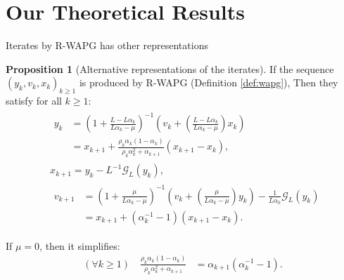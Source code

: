 \documentclass[11pt]{beamer}
\theoremstyle{definition}
\newtheorem{proposition}{Proposition}[section]
\begin{document}
\section{Our Theoretical Results}
    \begin{frame}{Iterates by R-WAPG has other representations}
        \begin{proposition}[Alternative representations of the iterates]\label{prop:wapg-first-equivalent-repr}
            If the sequence $(y_k, v_k, x_k)_{k \ge 1}$ is produced by R-WAPG (Definition \ref{def:wapg}),
            Then they satisfy for all $k\ge 1$: 
            {\footnotesize
            \begin{align}
                & \begin{aligned}
                    y_{k} &=
                    \left(
                        1 + \frac{L - L\alpha_{k}}{L\alpha_{k} - \mu}
                    \right)^{-1}
                    \left(
                        v_{k} +
                        \left(\frac{L - L\alpha_{k}}{L\alpha_{k} - \mu} \right) x_{k}
                    \right)
                    \\
                    &= x_{k + 1} +
                    \frac{\rho_k\alpha_k(1 - \alpha_k)}
                    {\rho_k\alpha_k^2 + \alpha_{k + 1}}(x_{k + 1} - x_k), 
                \end{aligned}
                \\
                & x_{k + 1} =
                y_k - L^{-1} \mathcal G_L (y_k),
                \\
                & \begin{aligned}
                    v_{k + 1} 
                    &=
                    \left(
                        1 + \frac{\mu}{L \alpha_k - \mu}
                    \right)^{-1}
                    \left(
                        v_k +
                        \left(\frac{\mu}{L \alpha_k - \mu}\right) y_k
                    \right) - \frac{1}{L\alpha_{k}}\mathcal G_L (y_k)
                    \\
                    &= 
                    x_{k + 1} + (\alpha_k^{-1} - 1)(x_{k + 1} - x_k).
                \end{aligned}
            \end{align}
            }
        \end{proposition}
        If $\mu = 0$, then it simplifies:
        {\small
        \begin{align*}
            (\forall k \ge 1) \quad
            \frac{\rho_k\alpha_k(1 - \alpha_k)}{\rho_k\alpha_k^2 + \alpha_{k + 1}}
            & = \alpha_{k + 1}(\alpha_k^{-1} - 1).
        \end{align*}
        }
    \end{frame}
\end{document}
